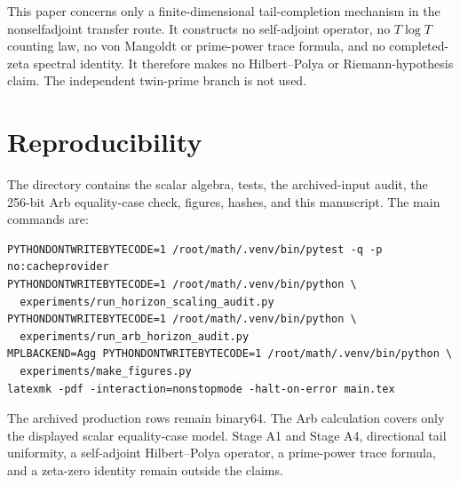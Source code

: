 \documentclass[11pt]{article}
\theoremstyle{remark}
\begin{document}
This paper concerns only a finite-dimensional tail-completion mechanism in
the nonselfadjoint transfer route.  It constructs no self-adjoint operator,
no $T\log T$ counting law, no von Mangoldt or prime-power trace formula, and
no completed-zeta spectral identity.  It therefore makes no
Hilbert--Polya or Riemann-hypothesis claim.  The independent twin-prime
branch is not used.

\section{Reproducibility}

The directory contains the scalar algebra, tests, the archived-input audit,
the 256-bit Arb equality-case check, figures, hashes, and this manuscript.
The main commands are:
\begin{verbatim}
PYTHONDONTWRITEBYTECODE=1 /root/math/.venv/bin/pytest -q -p no:cacheprovider
PYTHONDONTWRITEBYTECODE=1 /root/math/.venv/bin/python \
  experiments/run_horizon_scaling_audit.py
PYTHONDONTWRITEBYTECODE=1 /root/math/.venv/bin/python \
  experiments/run_arb_horizon_audit.py
MPLBACKEND=Agg PYTHONDONTWRITEBYTECODE=1 /root/math/.venv/bin/python \
  experiments/make_figures.py
latexmk -pdf -interaction=nonstopmode -halt-on-error main.tex
\end{verbatim}

The archived production rows remain binary64.  The Arb calculation covers
only the displayed scalar equality-case model.  Stage A1 and Stage A4,
directional tail uniformity, a self-adjoint Hilbert--Polya operator, a
prime-power trace formula, and a zeta-zero identity remain outside the
claims.



\end{document}
